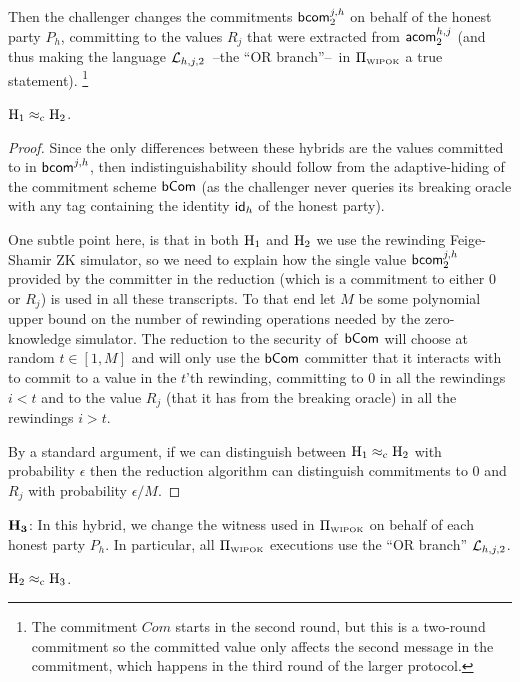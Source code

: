   Then the challenger changes the commitments ${\mathsf{bcom}}_2^{j,h}$ on behalf of the honest party $P_h$, committing to the values $R_j$ that were extracted from $\mathsf{acom}_2^{h,j}$ (and thus making the language ${{\cal L}_{h,j,2}}$~--the ``OR branch''--~in $\Pi_{{\scriptscriptstyle\mathrm{WIPOK}}}$ a true statement).%
\footnote{The commitment $Com$ starts in the second round, but this is a two-round commitment so the committed value only affects the second message in the commitment, which happens in the third round of the larger protocol.}

\BL\label{lemmab}$\mathrm{\mathrm{H}_{1}} \approx_{\mathrm{c}}  \mathrm{\mathrm{H}_{2}}$.\EL
\begin{proof}
Since the only differences between these hybrids are the values committed to in ${\mathsf{bcom}}^{j,h}$, then indistinguishability should follow from the adaptive-hiding of the commitment scheme $\mathsf{bCom}$ (as the challenger never queries its breaking oracle with any tag containing the identity $\mathsf{id}_h$ of the honest party).

One subtle point here, is that in both $\mathrm{\mathrm{H}_{1}}$ and $\mathrm{\mathrm{H}_{2}}$ we use the rewinding Feige-Shamir ZK simulator, so we need to explain how the single value ${\mathsf{bcom}}_2^{j,h}$ provided by the committer in the reduction (which is a commitment to either $0$ or $R_j$) is used in all these transcripts. To that end let $M$ be some polynomial upper bound on the number of rewinding operations needed by the zero-knowledge simulator. The reduction to the security of~$\mathsf{bCom}$ will choose at random $t\in[1,M]$ and will only use the $\mathsf{bCom}$ committer that it interacts with to commit to a value in the $t$'th rewinding, committing to $0$ in all the rewindings $i<t$ and to the value $R_j$ (that it has from the breaking oracle) in all the rewindings $i>t$.

By a standard argument, if we can distinguish between $\mathrm{\mathrm{H}_{1}} \approx_{\mathrm{c}}  \mathrm{\mathrm{H}_{2}}$ with probability $\epsilon$ then the reduction algorithm can distinguish commitments to 0 and $R_j$ with probability $\epsilon/M$.
\end{proof}

\smallskip
\item{$\bf H_3$:} In this hybrid, we change the witness used in $\Pi_{\scriptscriptstyle\mathrm{WIPOK}}$ on behalf of each honest party $P_h$. In particular, all $\Pi_{\scriptscriptstyle\mathrm{WIPOK}}$ executions use the ``OR branch'' ${{\cal L}_{h,j,2}}$.

\BL\label{wipok}$\mathrm{\mathrm{H}_{2}} \approx_{\mathrm{c}}  \mathrm{\mathrm{H}_{3}}$.\EL

